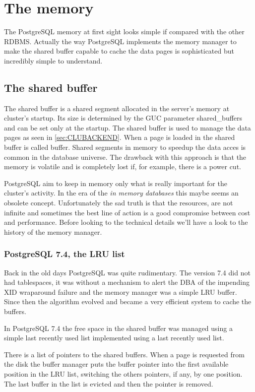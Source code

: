 \chapter{The memory}
\label{ch:PGMEMORY}
The PostgreSQL memory at first sight looks simple if compared with the other RDBMS.
Actually the way PostgreSQL implements the memory manager to make the shared buffer 
capable to cache the data pages is sophisticated but incredibly simple to understand.

\section{The shared buffer}
The shared buffer is a shared segment allocated in the server's memory at cluster's startup. 
Its size is determined by the GUC parameter shared\_buffers and can be set only at the startup. 
The shared buffer is used to manage the data pages as seen in \ref{sec:CLUBACKEND}. When a page is loaded
in the shared buffer is called buffer. Shared segments in memory to speedup the data acces is common in the database universe. 
The drawback with this approach is that the memory is volatile and is completely lost if, for example, there is a power cut.

PostgreSQL aim to keep in memory only what is really important for the cluster's activity. In the era of the 
\textit{in memory databases} this maybe seems an obsolete concept. Unfortunately the sad truth is that the 
resources, are not infinite and sometimes the best line of action is a good compromise between cost and performance.
Before looking to the technical details we'll have a look to the history of the memory manager. 


\subsection{PostgreSQL 7.4, the LRU list}
Back in the old days PostgreSQL was quite rudimentary. The version 7.4 did not had tablespaces, it was 
without a mechanism to alert the DBA of the impending XID wraparound failure and the memory manager was a simple LRU buffer. 
Since then the algorithm evolved and became a very efficient system to cache the buffers. 

In PostgreSQL 7.4 the free space in the shared buffer was managed using a simple last recently used list implemented using a last recently used list.

There is a  list of pointers to the shared buffers. When a page is requested from the disk the buffer manager puts the buffer pointer into the first available position 
in the LRU list, switching the others pointers, if any, by one position. The last buffer in the list is evicted and then the pointer is removed. 

